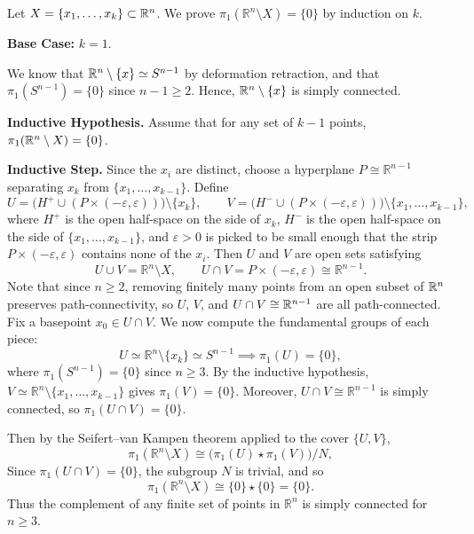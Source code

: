 \documentclass[12pt]{article}
\begin{document}
\begin{solution}
    \bbni

    Let $X = \{x_1, \ldots, x_k\} \subset {\mathbb R}^n$. We prove $\pi_1(\mathbb{R}^n \setminus X) = \{0\}$ by induction on $k$.

    \textbf{Base Case: } $k = 1$. 

    We know that $\mathbb R^n \setminus \{x\} \simeq S^{n-1}$ by deformation retraction, and that $\pi_1{(S^{n-1})} = \{0\}$ since $n - 1 \geq 2$. Hence, $\mathbb R^n \setminus \{x\}$ is simply connected. 

    \textbf{Inductive Hypothesis.} Assume that for any set of $k-1$ points, $\pi_1(\mathbb R^n \setminus X) = \{0\}$. 

    \textbf{Inductive Step.} Since the $x_i$ are distinct, choose a hyperplane $P \cong \mathbb{R}^{n-1}$ separating $x_k$ from $\{x_1, \ldots, x_{k-1}\}$. Define
    \[
        U = \bigl(H^+ \cup (P \times (-\varepsilon, \varepsilon))\bigr) \setminus \{x_k\},
        \qquad
        V = \bigl(H^- \cup (P \times (-\varepsilon, \varepsilon))\bigr) \setminus \{x_1, \ldots, x_{k-1}\},
    \]
    where $H^+$ is the open half-space on the side of $x_k$, $H^-$ is the open half-space on the side of $\{x_1, \ldots, x_{k-1}\}$, and $\varepsilon > 0$ is picked to be small enough that the strip $P \times (-\varepsilon, \varepsilon)$ contains none of the $x_i$. Then $U$ and $V$ are open sets satisfying
    \[
        U \cup V = \mathbb{R}^n \setminus X,
        \qquad
        U \cap V = P \times (-\varepsilon, \varepsilon) \cong \mathbb{R}^{n-1}.
    \]
    Note that since $n \geq 2$, removing finitely many points from an open subset of $\mathbb R^n$ preserves path-connectivity, so $U$, $V$, and $U \cap V \cong {\mathbb R}^{n-1}$ are all path-connected. Fix a basepoint $x_0 \in U \cap V$. We now compute the fundamental groups of each piece:
    \[
        U \simeq \mathbb{R}^n \setminus \{x_k\} \simeq S^{n-1}
        \implies \pi_1(U) = \{0\},
    \]
    where $\pi_1(S^{n-1}) = \{0\}$ since $n \geq 3$. By the inductive hypothesis, $V \simeq \mathbb{R}^n \setminus \{x_1, \ldots, x_{k-1}\}$ gives $\pi_1(V) = \{0\}$. Moreover, $U \cap V \cong \mathbb{R}^{n-1}$ is simply connected, so $\pi_1(U \cap V) = \{0\}$.

    Then by the Seifert--van Kampen theorem applied to the cover $\{U, V\}$,
    \[
        \pi_1(\mathbb{R}^n \setminus X) \cong \bigl(\pi_1(U) \star \pi_1(V)\bigr) / N,
    \]
    Since $\pi_1(U \cap V) = \{0\}$, the subgroup $N$ is trivial, and so
    \[
        \pi_1(\mathbb{R}^n \setminus X) \cong \{0\} \star \{0\} = \{0\}.
    \]
    Thus the complement of any finite set of points in $\mathbb{R}^n$ is simply connected for $n \geq 3$. 
\end{solution}
\end{document}
